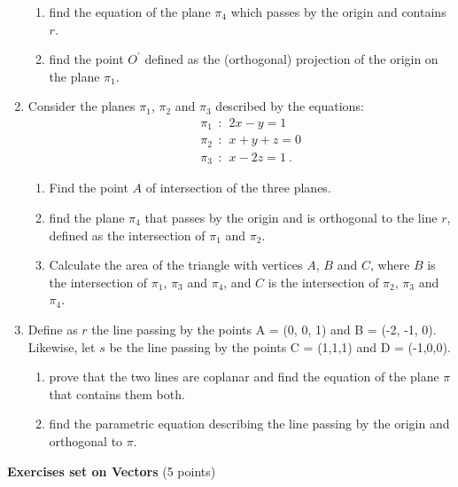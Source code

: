 \documentclass[fleqn]{article}
\begin{document}
\begin{enumerate}
\begin{enumerate}
    \item  find the equation of the plane $\pi_4$ which passes by the origin and contains $r$. 

    \item find the point $O^\prime$ defined as the (orthogonal) projection of the origin on the plane $\pi_1$. 
  \end{enumerate}

  \item Consider the planes $\pi_1$, $\pi_2$ and $\pi_3$ described by the equations: 
    \begin{eqnarray}
    &&\pi_1 ~~ :~~ 2x-y=1 \nonumber \\
    &&\pi_2 ~~ :~~ x+y+z=0 \nonumber \\
    &&\pi_3 ~~ :~~ x-2z=1 ~.\nonumber 
    \end{eqnarray}
    \begin{enumerate}
    \item Find the point $A$ of intersection of the three planes. 

    \item  find the plane $\pi_4 $ that passes by the origin and is orthogonal to the line $r$, defined as the intersection of $\pi_1$ and $\pi_2$. 

    \item Calculate the area of the triangle with vertices $A$, $B$ and $C$, where $B$ is the intersection of  $\pi_1$, $\pi_3$ and $\pi_4$, and $C$ is the intersection of $\pi_2$, $\pi_3$ and $\pi_4$. 

    \end{enumerate}


  \item Define as $r$ the line passing by the points A = (0, 0, 1) and B = (-2, -1, 0). Likewise, let $s$ be the line passing by the points C = (1,1,1) and D = (-1,0,0).
    \begin{enumerate}
    \item prove that the two lines are coplanar and find the equation of the plane $\pi$ that contains them both. 

    \item find the parametric equation describing the line passing by the origin and orthogonal to $\pi$. 
    \end{enumerate}

\end{enumerate}

\pagebreak

\textbf{Exercises set on Vectors} (5 points)
\end{document}
